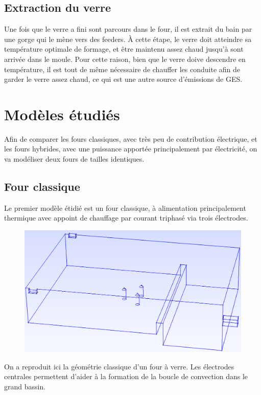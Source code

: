 \documentclass[12pt, a4paper, french, BCOR = 0pt, DIV = 10]{scrartcl}
\begin{document}
    \subsection{Extraction du verre}
    Une fois que le verre a fini sont parcours dans le four, il est extrait du bain par une gorge qui le mène vers des feeders. À cette étape, le verre doit atteindre sa température optimale de formage, et être maintenu assez chaud jusqu'à sont arrivée dans le moule. Pour cette raison, bien que le verre doive descendre en température, il est tout de même nécessaire de chauffer les conduite afin de garder le verre assez chaud, ce qui est une autre source d'émissions de GES.

    \section{Modèles étudiés}
    Afin de comparer les fours classiques, avec très peu de contribution électrique, et les fours hybrides, avec une puissance apportée principalement par électricité, on va modéliser deux fours de tailles identiques.

    \subsection{Four classique}
    Le premier modèle étidié est un four classique, à alimentation principalement thermique avec appoint de chauffage par courant triphasé via trois électrodes.

    \begin{center}
        \begin{figure}[H]
            \includegraphics[width=0.7\linewidth]{FourWall.png}
        \end{figure}
    \end{center}

    On a reproduit ici la géométrie classique d'un four à verre. Les électrodes centrales permettent d'aider à la formation de la boucle de convection dans le grand bassin.
    
\end{document}
